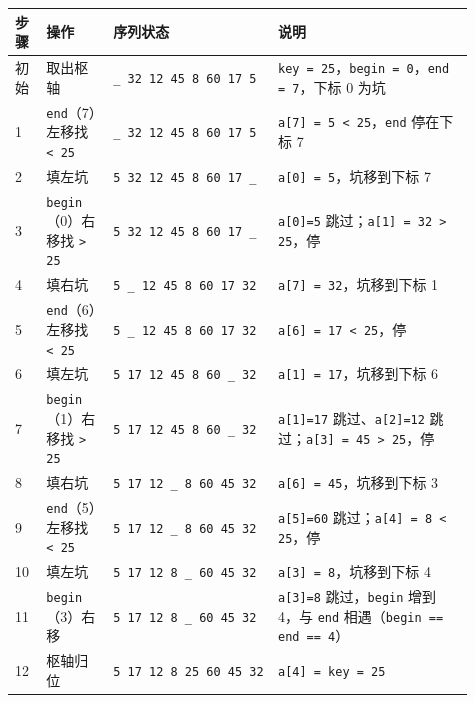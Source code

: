 \documentclass[11pt,openany,UTF8]{ctexbook}
\begin{document}
\begingroup\small\setlength{\tabcolsep}{4.0pt}
\begin{longtable}{@{}L{0.0688\linewidth}L{0.1339\linewidth}L{0.3255\linewidth}L{0.3832\linewidth}@{}}
\toprule
\textbf{步骤} & \textbf{操作} & \textbf{序列状态} & \textbf{说明} \\
\midrule
\endhead
初始 & 取出枢轴 & \texttt{\_ 32 12 45 8 60 17 5} & \texttt{key =\allowbreak{} 25}，\texttt{begin =\allowbreak{} 0}，\texttt{end =\allowbreak{} 7}，下标 0 为坑 \\
1 & \texttt{end}（7）左移找 \texttt{<\allowbreak{} 25} & \texttt{\_ 32 12 45 8 60 17 5} & \texttt{a[7]\allowbreak{} =\allowbreak{} 5 <\allowbreak{} 25}，\texttt{end} 停在下标 7 \\
2 & 填左坑 & \texttt{5 32 12 45 8 60 17 \_} & \texttt{a[0]\allowbreak{} =\allowbreak{} 5}，坑移到下标 7 \\
3 & \texttt{begin}（0）右移找 \texttt{>\allowbreak{} 25} & \texttt{5 32 12 45 8 60 17 \_} & \texttt{a[0]\allowbreak{}=\allowbreak{}5} 跳过；\texttt{a[1]\allowbreak{} =\allowbreak{} 32 >\allowbreak{} 25}，停 \\
4 & 填右坑 & \texttt{5 \_ 12 45 8 60 17 32} & \texttt{a[7]\allowbreak{} =\allowbreak{} 32}，坑移到下标 1 \\
5 & \texttt{end}（6）左移找 \texttt{<\allowbreak{} 25} & \texttt{5 \_ 12 45 8 60 17 32} & \texttt{a[6]\allowbreak{} =\allowbreak{} 17 <\allowbreak{} 25}，停 \\
6 & 填左坑 & \texttt{5 17 12 45 8 60 \_ 32} & \texttt{a[1]\allowbreak{} =\allowbreak{} 17}，坑移到下标 6 \\
7 & \texttt{begin}（1）右移找 \texttt{>\allowbreak{} 25} & \texttt{5 17 12 45 8 60 \_ 32} & \texttt{a[1]\allowbreak{}=\allowbreak{}17} 跳过、\texttt{a[2]\allowbreak{}=\allowbreak{}12} 跳过；\texttt{a[3]\allowbreak{} =\allowbreak{} 45 >\allowbreak{} 25}，停 \\
8 & 填右坑 & \texttt{5 17 12 \_ 8 60 45 32} & \texttt{a[6]\allowbreak{} =\allowbreak{} 45}，坑移到下标 3 \\
9 & \texttt{end}（5）左移找 \texttt{<\allowbreak{} 25} & \texttt{5 17 12 \_ 8 60 45 32} & \texttt{a[5]\allowbreak{}=\allowbreak{}60} 跳过；\texttt{a[4]\allowbreak{} =\allowbreak{} 8 <\allowbreak{} 25}，停 \\
10 & 填左坑 & \texttt{5 17 12 8 \_ 60 45 32} & \texttt{a[3]\allowbreak{} =\allowbreak{} 8}，坑移到下标 4 \\
11 & \texttt{begin}（3）右移 & \texttt{5 17 12 8 \_ 60 45 32} & \texttt{a[3]\allowbreak{}=\allowbreak{}8} 跳过，\texttt{begin} 增到 4，与 \texttt{end} 相遇（\texttt{begin =\allowbreak{}=\allowbreak{} end =\allowbreak{}=\allowbreak{} 4}） \\
12 & 枢轴归位 & \texttt{5 17 12 8 25 60 45 32} & \texttt{a[4]\allowbreak{} =\allowbreak{} key =\allowbreak{} 25} \\
\bottomrule
\end{longtable}
\endgroup
\end{document}
